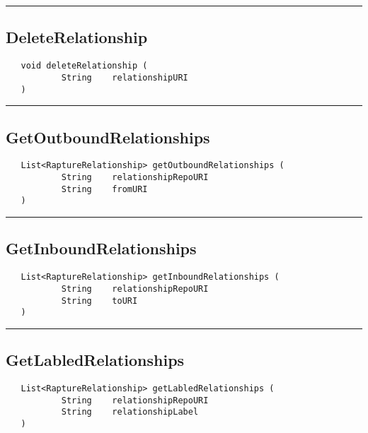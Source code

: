 \rule{15cm}{2pt}
\subsection{DeleteRelationship}
\label{Api:DeleteRelationship}
\begin{verbatim}
   void deleteRelationship (
           String    relationshipURI
   )
\end{verbatim}



\rule{15cm}{2pt}
\subsection{GetOutboundRelationships}
\label{Api:GetOutboundRelationships}
\begin{verbatim}
   List<RaptureRelationship> getOutboundRelationships (
           String    relationshipRepoURI
           String    fromURI
   )
\end{verbatim}



\rule{15cm}{2pt}
\subsection{GetInboundRelationships}
\label{Api:GetInboundRelationships}
\begin{verbatim}
   List<RaptureRelationship> getInboundRelationships (
           String    relationshipRepoURI
           String    toURI
   )
\end{verbatim}



\rule{15cm}{2pt}
\subsection{GetLabledRelationships}
\label{Api:GetLabledRelationships}
\begin{verbatim}
   List<RaptureRelationship> getLabledRelationships (
           String    relationshipRepoURI
           String    relationshipLabel
   )
\end{verbatim}



